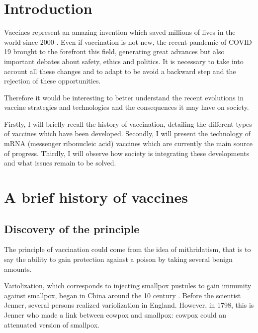 \documentclass{article}
\begin{document}
    

    \section{Introduction}

    Vaccines represent an amazing invention which saved millions of lives in the world since 2000 \autocite{HowManyLives2021}.
    Even if vaccination is not new, the recent pandemic of COVID-19 brought to the forefront this field, generating great advances but also important debates about safety, ethics and politics.
    It is necessary to take into account all these changes and to adapt to be avoid a backward step and the rejection of these opportunities. 
    
    Therefore it would be interesting to better understand the recent evolutions in vaccine strategies and technologies and the consequences it may have on society.
    
    Firstly, I will briefly recall the history of vaccination, detailing the different types of vaccines which have been developed.
    Secondly, I will present the technology of mRNA (messenger ribonucleic acid) vaccines which are currently the main source of progress.
    Thirdly, I will observe how society is integrating these developments and what issues remain to be solved.

    \section{A brief history of vaccines}

        \subsection{Discovery of the principle}

            The principle of vaccination could come from the idea of mithridatism, that is to say the ability to gain protection against a poison by taking several benign amounts.
            
            Variolization, which corresponds to injecting smallpox pustules to gain immunity against smallpox, began in China around the 10 century \autocite{canouiHistoryPrinciplesVaccination2019}. 
            Before the scientist Jenner, several persons realized variolization in England. However, in 1798, this is Jenner who made a link between cowpox and smallpox: 
                cowpox could an attenuated version of smallpox.            
\end{document}
